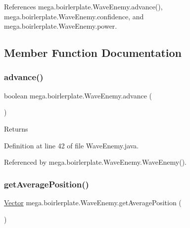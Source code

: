 References mega.\+boirlerplate.\+Wave\+Enemy.\+advance(), mega.\+boirlerplate.\+Wave\+Enemy.\+confidence, and mega.\+boirlerplate.\+Wave\+Enemy.\+power.



\subsection{Member Function Documentation}
\mbox{\label{classmega_1_1boirlerplate_1_1_wave_enemy_a049cfed9f952e92a40ca1676312dcf71}} 
\subsubsection{\texorpdfstring{advance()}{advance()}}
{\footnotesize\ttfamily boolean mega.\+boirlerplate.\+Wave\+Enemy.\+advance (\begin{DoxyParamCaption}{ }\end{DoxyParamCaption})}

\begin{DoxyReturn}{Returns}

\end{DoxyReturn}


Definition at line 42 of file Wave\+Enemy.\+java.



Referenced by mega.\+boirlerplate.\+Wave\+Enemy.\+Wave\+Enemy().

\mbox{\label{classmega_1_1boirlerplate_1_1_wave_enemy_a81411d993e5045444806b27339a87286}} 
\subsubsection{\texorpdfstring{get\+Average\+Position()}{getAveragePosition()}}
{\footnotesize\ttfamily \hyperlink{classmega_1_1boirlerplate_1_1_vector}{Vector} mega.\+boirlerplate.\+Wave\+Enemy.\+get\+Average\+Position (\begin{DoxyParamCaption}{ }\end{DoxyParamCaption})}


